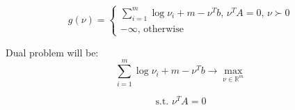 \begin{equation*}
    g (\nu) = \begin{cases}
        \sum\limits_{i=1}^m \log \nu_i + m - \nu^Tb \text{, } \nu^TA = 0\text{, } \nu \succ 0 \\
        -\infty \text{, otherwise}
    \end{cases}
\end{equation*}

Dual problem will be:
\begin{equation*}
 \sum\limits_{i=1}^m \log \nu_i + m -\nu^T b \rightarrow \max_{\nu \in \mathds{R}^m}
\end{equation*}

\begin{equation*}
    \text{s.t. } \nu^TA = 0
\end{equation*}
